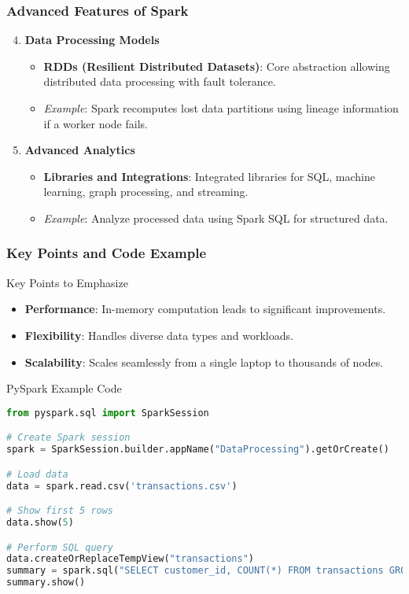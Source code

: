 \documentclass[aspectratio=169]{beamer}
\begin{document}
\begin{frame}[fragile]
    \frametitle{Advanced Features of Spark}
    \begin{enumerate}
        \setcounter{enumi}{3}
        \item \textbf{Data Processing Models}
            \begin{itemize}
                \item \textbf{RDDs (Resilient Distributed Datasets)}: Core abstraction allowing distributed data processing with fault tolerance.
                \item \textit{Example}: Spark recomputes lost data partitions using lineage information if a worker node fails.
            \end{itemize}
        
        \item \textbf{Advanced Analytics}
            \begin{itemize}
                \item \textbf{Libraries and Integrations}: Integrated libraries for SQL, machine learning, graph processing, and streaming.
                \item \textit{Example}: Analyze processed data using Spark SQL for structured data.
            \end{itemize}
    \end{enumerate}
\end{frame}

\begin{frame}[fragile]
    \frametitle{Key Points and Code Example}
    \begin{block}{Key Points to Emphasize}
        \begin{itemize}
            \item \textbf{Performance}: In-memory computation leads to significant improvements.
            \item \textbf{Flexibility}: Handles diverse data types and workloads.
            \item \textbf{Scalability}: Scales seamlessly from a single laptop to thousands of nodes.
        \end{itemize}
    \end{block}

    \begin{block}{PySpark Example Code}
        \begin{lstlisting}[language=Python]
from pyspark.sql import SparkSession

# Create Spark session
spark = SparkSession.builder.appName("DataProcessing").getOrCreate()

# Load data
data = spark.read.csv('transactions.csv')

# Show first 5 rows
data.show(5)

# Perform SQL query
data.createOrReplaceTempView("transactions")
summary = spark.sql("SELECT customer_id, COUNT(*) FROM transactions GROUP BY customer_id")
summary.show()
        \end{lstlisting}
    \end{block}
\end{frame}
\end{document}

